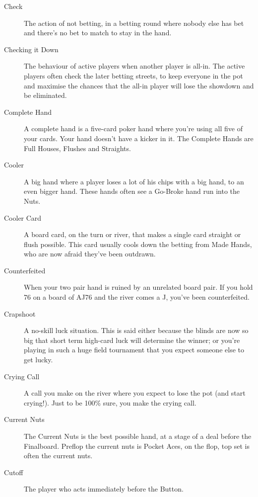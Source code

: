 \begin{description}
\item[Check] The action of not betting, in a betting round where
nobody else has bet and there's no bet to match to stay in the hand.

\item[Checking it Down] The behaviour of active players when another
player is all-in. The active players often check the later betting
streets, to keep everyone in the pot and maximise the chances that the
all-in player will lose the showdown and be eliminated.

\item[Complete Hand] A complete hand is a five-card poker hand where
you're using all five of your cards. Your hand doesn't have a kicker
in it. The Complete Hands are Full Houses, Flushes and Straights.

\item[Cooler] A big hand where a player loses a lot of his chips with
a big hand, to an even bigger hand. These hands often see a Go-Broke
hand run into the Nuts.

\item[Cooler Card] A board card, on the turn or river, that makes a
single card straight or flush possible. This card usually cools down
the betting from Made Hands, who are now afraid they've been outdrawn.

\item[Counterfeited] When your two pair hand is ruined by an unrelated
board pair. If you hold 76 on a board of AJ76 and the river comes a J,
you've been counterfeited.

\item[Crapshoot] A no-skill luck situation. This is said either
because the blinds are now so big that short term high-card luck will
determine the winner; or you're playing in such a huge field
tournament that you expect someone else to get lucky.

\item[Crying Call] A call you make on the river where you expect to
lose the pot (and start crying!). Just to be 100\% sure, you make the
crying call.

\item[Current Nuts] The Current Nuts is the best possible hand, at a
stage of a deal before the Finalboard. Preflop the current nuts is
Pocket Aces, on the flop, top set is often the current nuts.

\item[Cutoff] The player who acts immediately before the Button.


\end{description}
